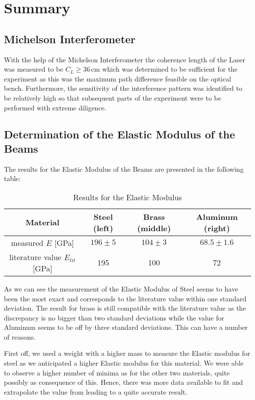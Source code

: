 \section{Summary}

\subsection{Michelson Interferometer}

With the help of the Michelson Interferometer the coherence length of the Laser was measured to be $C_L \geq 36\,\mathrm{cm}$ which was determined to be sufficient for the experiment as this was the maximum path difference feasible on the optical bench. Furthermore, the sensitivity of the interference pattern was identified to be relatively high so that subsequent parts of the experiment were to be performed with extreme diligence.

\subsection{Determination of the Elastic Modulus of the Beams}

The results for the Elastic Modulus of the Beams are presented in the following table:

\begin{table}[h!]
	\centering
	\begin{tabular}{c|c|c|c}
		Material							& Steel (left)	& Brass (middle)	& Aluminum (right)\\ \hline\hline
		measured $E$ [GPa]			& $196\pm5$	& 	$104\pm3$		& $68.5\pm1.6$			\\ \hline
	literature value \cite{staats} $E_{lit}$ [GPa]	& 195			& 100				& 72
	\end{tabular}
	\caption{Results for the Elastic Modulus}
\end{table}

As we can see the measurement of the Elastic Modulus of Steel seems to have been the most exact and corresponds to the literature value within one standard deviation.  The result for brass is still compatible with the literature value as the discrepancy is no bigger than two standard deviations while the value for Aluminum seems to be off by three standard deviations. This can have a number of reasons.

First off, we used a weight with a higher mass to measure the Elastic modulus for steel as we anticipated a higher Elastic modulus for this material. We were able to observe a higher number of minima as for the other two materials, quite possibly as consequence of this. Hence, there was more data available to fit and extrapolate the value from leading to a quite accurate result.

